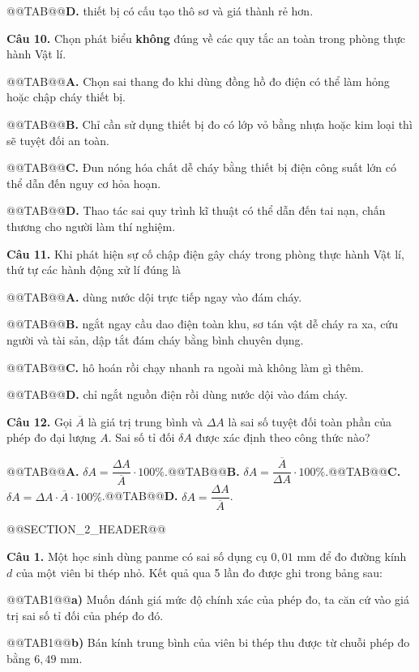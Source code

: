 \documentclass{article}
\begin{document}
@@TAB@@\textbf{D.} thiết bị có cấu tạo thô sơ và giá thành rẻ hơn.

\textbf{Câu 10.} Chọn phát biểu \textbf{không} đúng về các quy tắc an toàn trong phòng thực hành Vật lí.

@@TAB@@\textbf{A.} Chọn sai thang đo khi dùng đồng hồ đo điện có thể làm hỏng hoặc chập cháy thiết bị.

@@TAB@@\textbf{B.} Chỉ cần sử dụng thiết bị đo có lớp vỏ bằng nhựa hoặc kim loại thì sẽ tuyệt đối an toàn.

@@TAB@@\textbf{C.} Đun nóng hóa chất dễ cháy bằng thiết bị điện công suất lớn có thể dẫn đến nguy cơ hỏa hoạn.

@@TAB@@\textbf{D.} Thao tác sai quy trình kĩ thuật có thể dẫn đến tai nạn, chấn thương cho người làm thí nghiệm.

\textbf{Câu 11.} Khi phát hiện sự cố chập điện gây cháy trong phòng thực hành Vật lí, thứ tự các hành động xử lí đúng là

@@TAB@@\textbf{A.} dùng nước dội trực tiếp ngay vào đám cháy.

@@TAB@@\textbf{B.} ngắt ngay cầu dao điện toàn khu, sơ tán vật dễ cháy ra xa, cứu người và tài sản, dập tắt đám cháy bằng bình chuyên dụng.

@@TAB@@\textbf{C.} hô hoán rồi chạy nhanh ra ngoài mà không làm gì thêm.

@@TAB@@\textbf{D.} chỉ ngắt nguồn điện rồi dùng nước dội vào đám cháy.

\textbf{Câu 12.} Gọi $\overline{A}$ là giá trị trung bình và $\Delta A$ là sai số tuyệt đối toàn phần của phép đo đại lượng $A$. Sai số tỉ đối $\delta A$ được xác định theo công thức nào?

@@TAB@@\textbf{A.} $\delta A = \dfrac{\Delta A}{\overline{A}} \cdot 100\%$.@@TAB@@\textbf{B.} $\delta A = \dfrac{\overline{A}}{\Delta A} \cdot 100\%$.@@TAB@@\textbf{C.} $\delta A = \Delta A \cdot \overline{A} \cdot 100\%$.@@TAB@@\textbf{D.} $\delta A = \dfrac{\Delta A}{\overline{A}}$.

@@SECTION_2_HEADER@@

\textbf{Câu 1.} Một học sinh dùng panme có sai số dụng cụ $0{,}01\text{ mm}$ để đo đường kính $d$ của một viên bi thép nhỏ. Kết quả qua 5 lần đo được ghi trong bảng sau:

@@TAB1@@\textbf{a)} Muốn đánh giá mức độ chính xác của phép đo, ta căn cứ vào giá trị sai số tỉ đối của phép đo đó.

@@TAB1@@\textbf{b)} Bán kính trung bình của viên bi thép thu được từ chuỗi phép đo bằng $6{,}49\text{ mm}$.
\end{document}
